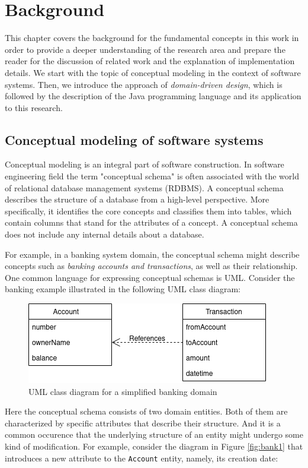 \chapter{Background}
This chapter covers the background for the fundamental concepts in this work in order to provide a deeper understanding of the research area and prepare the reader for the discussion of related work and the explanation of implementation details.
We start with the topic of conceptual modeling in the context of software systems.
Then, we introduce the approach of \textit{domain-driven design}, which is followed by the description of the Java programming language and its application to this research.

\section{Conceptual modeling of software systems}
Conceptual modeling is an integral part of software construction.
In software engineering field the term "conceptual schema" is often associated with the world of relational database management systems (RDBMS).
A conceptual schema describes the structure of a database from a high-level perspective.
More specifically, it identifies the core concepts and classifies them into tables, which contain columns that stand for the attributes of a concept.
A conceptual schema does not include any internal details about a database.

\n

For example, in a banking system domain, the conceptual schema might describe concepts such as \textit{banking accounts and transactions}, as well as their relationship.
One common language for expressing conceptual schemas is UML.
Consider the banking example illustrated in the following UML class diagram:

\begin{figure}[H]\centering
    \includegraphics[scale=0.65]{images/banking.drawio.png}
    \caption{UML class diagram for a simplified banking domain}\label{fig:bank}
\end{figure}

Here the conceptual schema consists of two domain entities.
Both of them are characterized by specific attributes that describe their structure.
And it is a common occurence that the underlying structure of an entity might undergo some kind of modification.
For example, consider the diagram in Figure \ref{fig:bank1} that introduces a new attribute to the \texttt{Account} entity, namely, its creation date:

